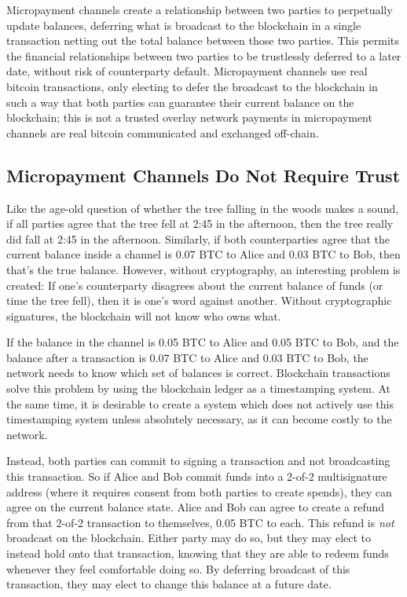 \documentclass[letterpaper,11pt]{article}
\begin{document}
Micropayment channels\cite{wikicontracts}\cite{bitcoinjmicropay} create a
relationship between two parties to perpetually update balances, deferring what
is broadcast to the blockchain in a single transaction netting out the total
balance between those two parties. This permits the financial relationships
between two parties to be trustlessly deferred to a later date, without risk of
counterparty default. Micropayment channels use real bitcoin transactions, only
electing to defer the broadcast to the blockchain in such a way that both
parties can guarantee their current balance on the blockchain; this is not a
trusted overlay network \textemdash payments in micropayment channels are real
bitcoin communicated and exchanged off-chain.

\subsection{Micropayment Channels Do Not Require Trust}

Like the age-old question of whether the tree falling in the woods makes a
sound, if all parties agree that the tree fell at 2:45 in the afternoon, then
the tree really did fall at 2:45 in the afternoon. Similarly, if both
counterparties agree that the current balance inside a channel is 0.07 BTC to
Alice and 0.03 BTC to Bob, then that's the true balance. However, without
cryptography, an interesting problem is created: If one's counterparty
disagrees about the current balance of funds (or time the tree fell), then it
is one's word against another. Without cryptographic signatures, the blockchain
will not know who owns what. 

If the balance in the channel is 0.05 BTC to Alice and 0.05 BTC to Bob, and the
balance after a transaction is 0.07 BTC to Alice and 0.03 BTC to Bob, the
network needs to know which set of balances is correct. Blockchain transactions
solve this problem by using the blockchain ledger as a timestamping system. At
the same time, it is desirable to create a system which does not actively use
this timestamping system unless absolutely necessary, as it can become costly to
the network.

Instead, both parties can commit to signing a transaction and not broadcasting
this transaction. So if Alice and Bob commit funds into a 2-of-2 multisignature
address (where it requires consent from both parties to create spends), they
can agree on the current balance state. Alice and Bob can agree to create a
refund from that 2-of-2 transaction to themselves, 0.05 BTC to each. This
refund is \textit{not} broadcast on the blockchain. Either party may do so, but
they may elect to instead hold onto that transaction, knowing that they are
able to redeem funds whenever they feel comfortable doing so. By deferring
broadcast of this transaction, they may elect to change this balance at a
future date.
\end{document}
